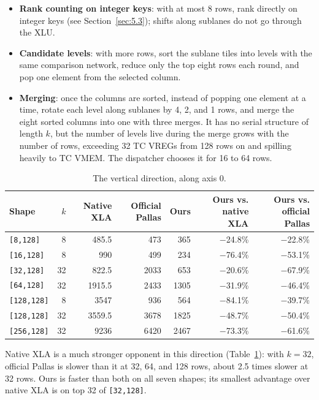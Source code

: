 \documentclass[sigconf,nonacm,balance=false]{acmart}
\newcommand{\code}[1]{\texttt{#1}}
\begin{document}
\begin{itemize}
\item \textbf{Rank counting on integer keys}: with at most 8 rows, rank directly on integer keys (see Section~\ref{sec:5.3}); shifts along sublanes do not go through the XLU.
\item \textbf{Candidate levels}: with more rows, sort the sublane tiles into levels with the same comparison network, reduce only the top eight rows each round, and pop one element from the selected column.
\item \textbf{Merging}: once the columns are sorted, instead of popping one element at a time, rotate each level along sublanes by 4, 2, and 1 rows, and merge the eight sorted columns into one with three merges. It has no serial structure of length $k$, but the number of levels live during the merge grows with the number of rows, exceeding 32 TC VREGs from 128 rows on and spilling heavily to TC VMEM. The dispatcher chooses it for 16 to 64 rows.
\end{itemize}

\begin{table}
\centering
\caption{The vertical direction, along axis 0.}
\label{tab:7}
\begin{tabular}{lrrrrrr}
\toprule
Shape & $k$ & Native XLA & Official Pallas & Ours & Ours vs. native XLA & Ours vs. official Pallas \\
\midrule
\code{[8,\allowbreak{}128]} & 8 & 485.5 & 473 & 365 & $-$24.8\% & $-$22.8\% \\
\code{[16,\allowbreak{}128]} & 8 & 990 & 499 & 234 & $-$76.4\% & $-$53.1\% \\
\code{[32,\allowbreak{}128]} & 32 & 822.5 & 2033 & 653 & $-$20.6\% & $-$67.9\% \\
\code{[64,\allowbreak{}128]} & 32 & 1915.5 & 2433 & 1305 & $-$31.9\% & $-$46.4\% \\
\code{[128,\allowbreak{}128]} & 8 & 3547 & 936 & 564 & $-$84.1\% & $-$39.7\% \\
\code{[128,\allowbreak{}128]} & 32 & 3559.5 & 3678 & 1825 & $-$48.7\% & $-$50.4\% \\
\code{[256,\allowbreak{}128]} & 32 & 9236 & 6420 & 2467 & $-$73.3\% & $-$61.6\% \\
\bottomrule
\end{tabular}
\end{table}

Native XLA is a much stronger opponent in this direction (Table~\ref{tab:7}): with $k = 32$, official Pallas is slower than it at 32, 64, and 128 rows, about 2.5 times slower at 32 rows. Ours is faster than both on all seven shapes; its smallest advantage over native XLA is on top 32 of \code{[32,\allowbreak{}128]}.
\end{document}
